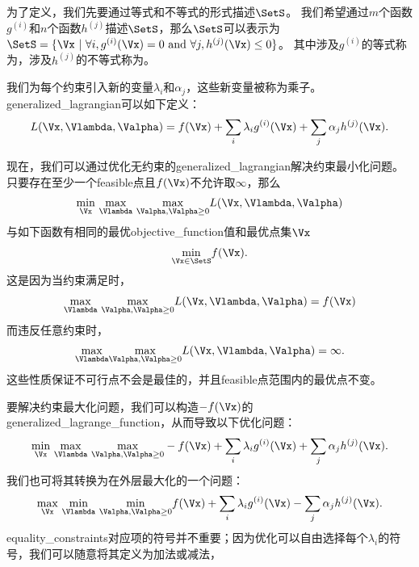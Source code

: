 为了定义，我们先要通过等式和不等式的形式描述$\SetS$。 
我们希望通过$m$个函数$g^{(i)}$和$n$个函数$h^{(j)}$描述$\SetS$，那么$\SetS$可以表示为$\SetS = \{ \Vx ~|~ \forall i, g^{(i)}(\Vx) = 0 ~\text{and}~ \forall j, h^{(j)}(\Vx) \leq 0  \}$。
其中涉及$g^{(i)}$的等式称为，涉及$h^{(j)}$的不等式称为。

我们为每个约束引入新的变量$\lambda_i$和$\alpha_j$，这些新变量被称为乘子。\gls{generalized_lagrangian}可以如下定义：
\begin{align}
 L(\Vx, \Vlambda, \Valpha) = f(\Vx) + \sum_i \lambda_i g^{(i)}(\Vx)  + \sum_j \alpha_j h^{(j)}(\Vx).
\end{align}

现在，我们可以通过优化无约束的\gls{generalized_lagrangian}解决约束最小化问题。
只要存在至少一个\gls{feasible}点且$f(\Vx)$不允许取$\infty$，那么
\begin{align}
 \underset{\Vx}{\min}~  \underset{\Vlambda}{\max}~
 \underset{\Valpha, \Valpha \geq 0}{\max}   L(\Vx, \Vlambda, \Valpha) 
\end{align}
与如下函数有相同的最优\gls{objective_function}值和最优点集$\Vx$
\begin{align}
 \underset{\Vx \in \SetS}{\min} f(\Vx).
\end{align}
这是因为当约束满足时，
\begin{align}
  \underset{\Vlambda}{\max}~
 \underset{\Valpha, \Valpha \geq 0}{\max}   L(\Vx, \Vlambda, \Valpha)  = f(\Vx)
\end{align}
而违反任意约束时，
\begin{align}
  \underset{\Vlambda}{\max}  
 \underset{\Valpha, \Valpha \geq 0}{\max}   L(\Vx, \Vlambda, \Valpha)  = \infty .
\end{align}
这些性质保证不可行点不会是最佳的，并且\gls{feasible}点范围内的最优点不变。


要解决约束最大化问题，我们可以构造$-f(\Vx)$的\gls{generalized_lagrange_function}，从而导致以下优化问题：
\begin{align}
 \underset{\Vx}{\min}~ \underset{\Vlambda}{\max}  ~
 \underset{\Valpha, \Valpha \geq 0}{\max} 
  -f(\Vx) + \sum_i \lambda_i g^{(i)}(\Vx)  + \sum_j \alpha_j h^{(j)}(\Vx).
\end{align}
我们也可将其转换为在外层最大化的一个问题：
\begin{align}
 \underset{\Vx}{\max}~ \underset{\Vlambda}{\min}~
 \underset{\Valpha, \Valpha \geq 0}{\min} 
  f(\Vx) + \sum_i \lambda_i g^{(i)}(\Vx) - \sum_j \alpha_j h^{(j)}(\Vx).
\end{align}
\gls{equality_constraints}对应项的符号并不重要；因为优化可以自由选择每个$\lambda_i$的符号，我们可以随意将其定义为加法或减法，

